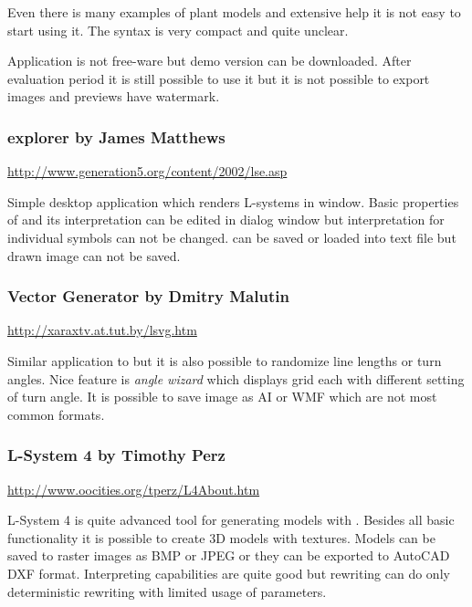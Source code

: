 Even there is many examples of plant models and extensive help it is not easy to start using it.
The syntax is very compact and quite unclear.

Application is not free-ware but demo version can be downloaded.
After evaluation period it is still possible to use it but it is not possible to export images and previews have watermark. 


\subsubsection{\lsystems explorer by James Matthews}
{ \vspace{-10pt} \footnotesize \url{http://www.generation5.org/content/2002/lse.asp} }
\label{sec:LsystemExplorer}

Simple desktop application which renders L-systems in window.
Basic properties of \lsystem and its interpretation can be edited in dialog window but interpretation for individual symbols can not be changed.
\lsystems can be saved or loaded into text file but drawn image can not be saved.


\subsubsection{\lsystem Vector Generator by Dmitry Malutin}
{ \vspace{-10pt} \footnotesize \url{http://xaraxtv.at.tut.by/lsvg.htm} }

Similar application to  but it is also possible to randomize line lengths or turn angles.
Nice feature is \emph{angle wizard} which displays grid \lsystems each with different setting of turn angle.
It is possible to save image as AI or WMF which are not most common formats.


\subsubsection{L-System 4 by Timothy Perz}
{ \vspace{-10pt} \footnotesize \url{http://www.oocities.org/tperz/L4About.htm} }

L-System 4 is quite advanced tool for generating models with \lsystems.
Besides all basic functionality it is possible to create 3D models with textures.
Models can be saved to raster images as BMP or JPEG or they can be exported to AutoCAD DXF format.
Interpreting capabilities are quite good but \lsystem rewriting can do only deterministic rewriting with limited usage of parameters.























